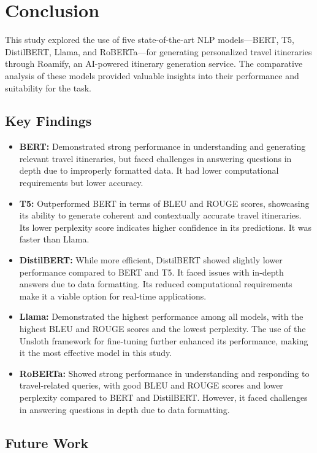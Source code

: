 \documentclass[conference]{IEEEtran}
\begin{document}
\section{Conclusion}

This study explored the use of five state-of-the-art NLP models—BERT, T5, DistilBERT, Llama, and RoBERTa—for generating personalized travel itineraries through Roamify, an AI-powered itinerary generation service. The comparative analysis of these models provided valuable insights into their performance and suitability for the task.

\subsection{Key Findings}

\begin{itemize}
    \item \textbf{BERT:} Demonstrated strong performance in understanding and generating relevant travel itineraries, but faced challenges in answering questions in depth due to improperly formatted data. It had lower computational requirements but lower accuracy.
    \item \textbf{T5:} Outperformed BERT in terms of BLEU and ROUGE scores, showcasing its ability to generate coherent and contextually accurate travel itineraries. Its lower perplexity score indicates higher confidence in its predictions. It was faster than Llama.
    \item \textbf{DistilBERT:} While more efficient, DistilBERT showed slightly lower performance compared to BERT and T5. It faced issues with in-depth answers due to data formatting. Its reduced computational requirements make it a viable option for real-time applications.
    \item \textbf{Llama:} Demonstrated the highest performance among all models, with the highest BLEU and ROUGE scores and the lowest perplexity. The use of the Unsloth framework for fine-tuning further enhanced its performance, making it the most effective model in this study.
    \item \textbf{RoBERTa:} Showed strong performance in understanding and responding to travel-related queries, with good BLEU and ROUGE scores and lower perplexity compared to BERT and DistilBERT. However, it faced challenges in answering questions in depth due to data formatting.
\end{itemize}

\subsection{Future Work}
\end{document}
